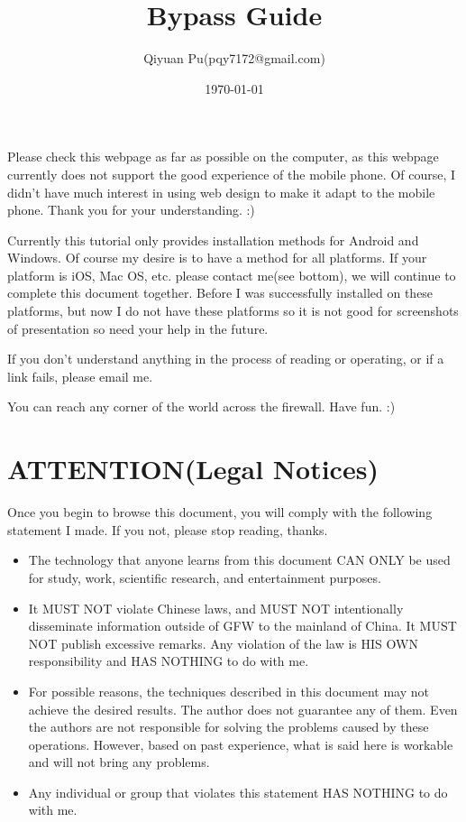 \documentclass[12pt]{wx672article}
\author{Qiyuan Pu(pqy7172@gmail.com)}
\date{\today}
\title{Bypass Guide}
\begin{document}
\maketitle
\tableofcontents

Please check this webpage as far as possible on the computer, as this webpage currently
does not support the good experience of the mobile phone. Of course, I didn't have much
interest in using web design to make it adapt to the mobile phone. Thank you for your
understanding. :)

Currently this tutorial only provides installation methods for Android and Windows. Of
course my desire is to have a method for all platforms. If your platform is iOS, Mac OS,
etc. please contact me(see bottom), we will continue to complete this document together.
Before I was successfully installed on these platforms, but now I do not have these
platforms so it is not good for screenshots of presentation so need your help in the
future.


If you don't understand anything in the process of reading or operating, or if a link
fails, please email me.

You can reach any corner of the world across the firewall. Have fun. :)

\section*{ATTENTION(Legal Notices)}
\label{sec:org92b9747}
Once you begin to browse this document, you will comply with the following statement I
made. If you not, please stop reading, thanks.
\begin{itemize}
\item The technology that anyone learns from this document CAN ONLY be used for study, work,
scientific research, and entertainment purposes.
\end{itemize}


\begin{itemize}
\item It MUST NOT violate Chinese laws, and MUST NOT intentionally disseminate information
outside of GFW to the mainland of China. It MUST NOT publish excessive remarks. Any
violation of the law is HIS OWN responsibility and HAS NOTHING to do with me.

\item For possible reasons, the techniques described in this document may not achieve the
desired results. The author does not guarantee any of them. Even the authors are not
responsible for solving the problems caused by these operations. However, based on past
experience, what is said here is workable and will not bring any problems.

\item Any individual or group that violates this statement HAS NOTHING to do with me.
\end{itemize}
\end{document}
